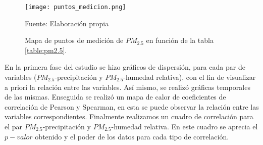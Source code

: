 \documentclass[a4paper,11pt]{article}
\begin{document}
\begin{figure}[H]
	\centering
     \texttt{[image: puntos\_medicion.png]}
	\caption{ Mapa de puntos de medición de $PM_{2.5}$ en función de la tabla \ref{table:pm2.5}. }	
    \label{img:mapa 1}
    
    \centerline{Fuente: Elaboración propia }
\end{figure}



En la primera fase del estudio se hizo gráficos de dispersión, para cada par de variables ($PM_{2.5}$-precipitación y $PM_{2.5}$-humedad relativa), con el fin de visualizar a priori la relación entre las variables. Así mismo, se realizó gráficas temporales de las mismas. Enseguida se realizó un mapa de calor de coeficientes de correlación de Pearson y Spearman, en esta se puede observar la relación entre las variables correspondientes. Finalmente realizamos un cuadro de correlación para el par $PM_{2.5}$-precipitación y $PM_{2.5}$-humedad relativa. En este cuadro se aprecia el $p-valor$ obtenido y el poder de los datos para cada tipo de correlación.
\end{document}
